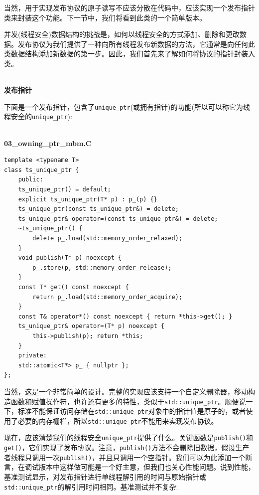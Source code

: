 当然，用于实现发布协议的原子读写不应该分散在代码中，应该实现一个发布指针类来封装这个功能。下一节中，我们将看到此类的一个简单版本。


并发(线程安全)数据结构的挑战是，如何以线程安全的方式添加、删除和更改数据。发布协议为我们提供了一种向所有线程发布新数据的方法，它通常是向任何此类数据结构添加新数据的第一步。因此，我们首先来了解如何将协议的指针封装入类。

\hspace*{\fill} \\ %
\noindent
\textbf{发布指针}

下面是一个发布指针，包含了\texttt{unique\_ptr}(或拥有指针)的功能(所以可以称它为线程安全的\texttt{unique\_ptr}):

\hspace*{\fill} \\ %
\noindent
\textbf{03\_owning\_ptr\_mbm.C}
\begin{lstlisting}[style=styleCXX]
template <typename T>
class ts_unique_ptr {
	public:
	ts_unique_ptr() = default;
	explicit ts_unique_ptr(T* p) : p_(p) {}
	ts_unique_ptr(const ts_unique_ptr&) = delete;
	ts_unique_ptr& operator=(const ts_unique_ptr&) = delete;
	~ts_unique_ptr() {
		delete p_.load(std::memory_order_relaxed);
	}
	void publish(T* p) noexcept {
		p_.store(p, std::memory_order_release);
	}
	const T* get() const noexcept {
		return p_.load(std::memory_order_acquire);
	}
	const T& operator*() const noexcept { return *this->get(); }
	ts_unique_ptr& operator=(T* p) noexcept {
		this->publish(p); return *this;
	}
	private:
	std::atomic<T*> p_ { nullptr };
};
\end{lstlisting}

当然，这是一个非常简单的设计。完整的实现应该支持一个自定义删除器，移动构造函数和赋值操作符，也许还有更多的特性，类似于\texttt{std::unique\_ptr}。顺便说一下，标准不能保证访问存储在\texttt{std::unique\_ptr}对象中的指针值是原子的，或者使用了必要的内存栅栏，所以\texttt{std::unique\_ptr}不能用来实现发布协议。

现在，应该清楚我们的线程安全\texttt{unique\_ptr}提供了什么。关键函数是\texttt{publish()}和\texttt{get()}，它们实现了发布协议。注意，\texttt{publish()}方法不会删除旧数据，假设生产者线程只调用一次\texttt{publish()}，并且只调用一个空指针。我们可以为此添加一个断言，在调试版本中这样做可能是一个好主意，但我们也关心性能问题。说到性能，基准测试显示，对发布指针进行单线程解引用的时间与原始指针或\texttt{std::unique\_ptr}的解引用时间相同。基准测试并不复杂:

